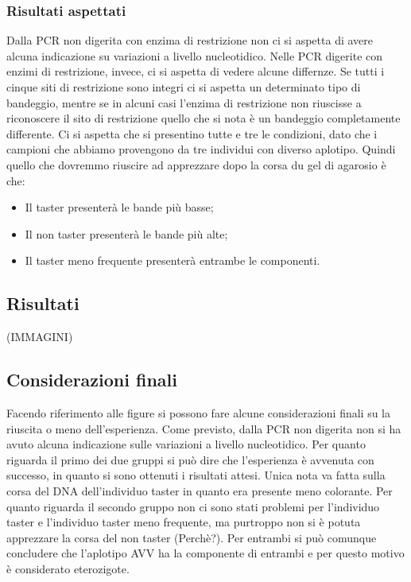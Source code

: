 	    \subsubsection*{Risultati aspettati}
    
        Dalla PCR non digerita con enzima di restrizione non ci si aspetta di avere alcuna indicazione su variazioni a livello nucleotidico. 
        Nelle PCR digerite con enzimi di restrizione, invece, ci si aspetta di vedere alcune differnze. Se tutti i cinque siti di restrizione sono integri ci si aspetta un determinato tipo di bandeggio, mentre se in alcuni casi l'enzima di restrizione non riuscisse a riconoscere il sito di restrizione quello che si nota è un bandeggio completamente differente. 
        Ci si aspetta che si presentino tutte e tre le condizioni, dato che i campioni che abbiamo provengono da tre individui con diverso aplotipo. Quindi quello che dovremmo riuscire ad apprezzare dopo la corsa du gel di agarosio è che:
        \begin{itemize}
            \item Il taster presenterà le bande più basse; 
            \item Il non taster presenterà le bande più alte;
            \item Il taster meno frequente presenterà entrambe le componenti. 
        \end{itemize}
	
	\subsection*{Risultati}
	
		(IMMAGINI)

	\subsection*{Considerazioni finali}
	
	Facendo riferimento alle figure si possono fare alcune considerazioni finali su la riuscita o meno dell'esperienza. 
	Come previsto, dalla PCR non digerita non si ha avuto alcuna indicazione sulle variazioni a livello nucleotidico.
	Per quanto riguarda il primo dei due gruppi si può dire che l'esperienza è avvenuta con successo, in quanto si sono ottenuti i risultati attesi. Unica nota va fatta sulla corsa del DNA dell'individuo taster in quanto era presente meno colorante. 
	Per quanto riguarda il secondo gruppo non ci sono stati problemi per l'individuo taster e l'individuo taster meno frequente, ma purtroppo non si è potuta apprezzare la corsa del non taster (Perchè?). 
	Per entrambi si può comunque concludere che l'aplotipo AVV ha la componente di entrambi e per questo motivo è considerato eterozigote. 
